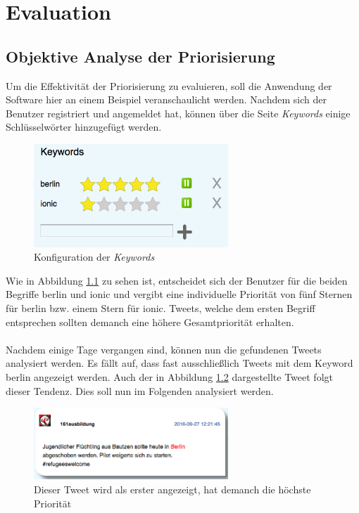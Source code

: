\chapter{Evaluation}
\section{Objektive Analyse der Priorisierung}
Um die Effektivität der Priorisierung zu evaluieren, soll die Anwendung der Software hier an einem Beispiel veranschaulicht werden. Nachdem sich der Benutzer registriert und angemeldet hat, können über die Seite \textit{Keywords} einige Schlüsselwörter hinzugefügt werden.
%
\medskip
\begin{figure}[!h]
    \centering
    \includegraphics[width=0.65\textwidth]{Graphics/keywords}
    \caption{Konfiguration der \textit{Keywords}}
   \label{fig:keywords}
\end{figure}
%
Wie in Abbildung \ref{fig:keywords} zu sehen ist, entscheidet sich der Benutzer für die beiden Begriffe \glqq berlin\grqq{} und \glqq ionic\grqq{} und vergibt eine individuelle Priorität von fünf Sternen für \glqq berlin\grqq{} bzw. einem Stern für \glqq ionic\grqq{}. Tweets, welche dem ersten Begriff entsprechen sollten demanch eine höhere Gesamtpriorität erhalten. \\\\
Nachdem einige Tage vergangen sind, können nun die gefundenen Tweets analysiert werden. Es fällt auf, dass fast ausschließlich Tweets mit dem Keyword \glqq berlin\grqq{} angezeigt werden. Auch der in Abbildung \ref{fig:tweet_berlin} dargestellte Tweet folgt dieser Tendenz. Dies soll nun im Folgenden analysiert werden. 
%
\medskip
\begin{figure}[!h]
    \centering
    \includegraphics[width=0.65\textwidth]{Graphics/tweet_berlin}
    \caption[Tweet: Schlüsselwort \glqq berlin\grqq{}]{Dieser Tweet wird als erster angezeigt, hat demanch die höchste Priorität}
   \label{fig:tweet_berlin}
\end{figure}
